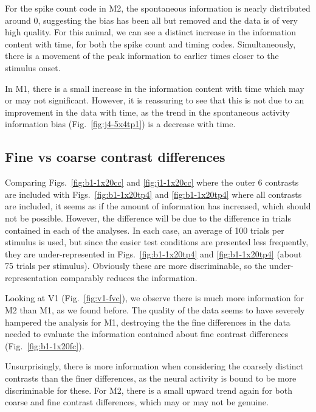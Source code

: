 For the spike count code in \ac{M2}, the spontaneous information is nearly distributed around 0, suggesting the bias has been all but removed and the data is of very high quality. For this animal, we can see a distinct increase in the information content with time, for both the spike count and timing codes. Simultaneously, there is a movement of the peak information to earlier times closer to the stimulus onset.

In \ac{M1}, there is a small increase in the information content with time which may or may not significant. However, it is reassuring to see that this is not due to an improvement in the data with time, as the trend in the spontaneous activity information bias (Fig.~\ref{fig:j4-5x4tp1}) is a decrease with time.

\FloatBarrier
\subsection{Fine vs coarse contrast differences}

Comparing Figs.~\ref{fig:b1-1x20cc} and \ref{fig:j1-1x20cc} where the outer 6 contrasts are included with Figs.~\ref{fig:b1-1x20tp4} and \ref{fig:b1-1x20tp4} where all contrasts are included, it seems as if the amount of information has increased, which should not be possible. However, the difference will be due to the difference in trials contained in each of the analyses. In each case, an average of 100 trials per stimulus is used, but since the easier test conditions are presented less frequently, they are under-represented in Figs.~\ref{fig:b1-1x20tp4} and \ref{fig:b1-1x20tp4} (about 75 trials per stimulus). Obviously these are more discriminable, so the under-representation comparably reduces the information.

Looking at \ac{V1} (Fig.~\ref{fig:v1-fvc}), we observe there is much more information for \ac{M2} than \ac{M1}, as we found before. The quality of the data seems to have severely hampered the analysis for \ac{M1}, destroying the the fine differences in the data needed to evaluate the information contained about fine contrast differences (Fig.~\ref{fig:b1-1x20fc}).

Unsurprisingly, there is more information when considering the coarsely distinct contrasts than the finer differences, as the neural activity is bound to be more discriminable for these. For \ac{M2}, there is a small upward trend again for both coarse and fine contrast differences, which may or may not be genuine.

